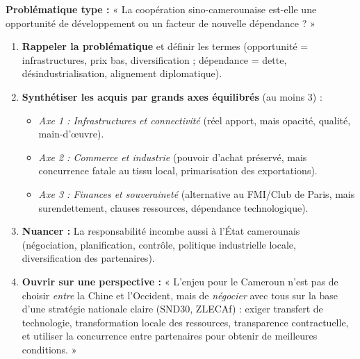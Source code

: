 \documentclass[11pt]{article}
\begin{document}
\begin{methode}
\textbf{Problématique type :} « La coopération sino-camerounaise est-elle une opportunité de développement ou un facteur de nouvelle dépendance ? »

\begin{enumerate}
    \item \textbf{Rappeler la problématique} et définir les termes (opportunité = infrastructures, prix bas, diversification ; dépendance = dette, désindustrialisation, alignement diplomatique).
    \item \textbf{Synthétiser les acquis par grands axes équilibrés} (au moins 3) :
        \begin{itemize}
            \item \textit{Axe 1 : Infrastructures et connectivité} (réel apport, mais opacité, qualité, main-d'œuvre).
            \item \textit{Axe 2 : Commerce et industrie} (pouvoir d'achat préservé, mais concurrence fatale au tissu local, primarisation des exportations).
            \item \textit{Axe 3 : Finances et souveraineté} (alternative au FMI/Club de Paris, mais surendettement, clauses ressources, dépendance technologique).
        \end{itemize}
    \item \textbf{Nuancer :} La responsabilité incombe aussi à l'État camerounais (négociation, planification, contrôle, politique industrielle locale, diversification des partenaires).
    \item \textbf{Ouvrir sur une perspective :} « L'enjeu pour le Cameroun n'est pas de choisir \emph{entre} la Chine et l'Occident, mais de \emph{négocier} avec tous sur la base d'une stratégie nationale claire (SND30, ZLECAf) : exiger transfert de technologie, transformation locale des ressources, transparence contractuelle, et utiliser la concurrence entre partenaires pour obtenir de meilleures conditions. »
\end{enumerate}
\end{methode}
\end{document}
